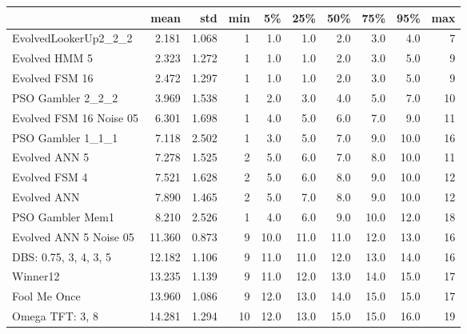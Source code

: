 \begin{tabular}{lrrrrrrrrr}
\toprule
{} &    mean &    std &  min &    5\% &   25\% &   50\% &   75\% &   95\% &  max \\
\midrule
EvolvedLookerUp2\_2\_2    &   2.181 &  1.068 &    1 &   1.0 &   1.0 &   2.0 &   3.0 &   4.0 &    7 \\
Evolved HMM 5           &   2.323 &  1.272 &    1 &   1.0 &   1.0 &   2.0 &   3.0 &   5.0 &    9 \\
Evolved FSM 16          &   2.472 &  1.297 &    1 &   1.0 &   1.0 &   2.0 &   3.0 &   5.0 &    9 \\
PSO Gambler 2\_2\_2       &   3.969 &  1.538 &    1 &   2.0 &   3.0 &   4.0 &   5.0 &   7.0 &   10 \\
Evolved FSM 16 Noise 05 &   6.301 &  1.698 &    1 &   4.0 &   5.0 &   6.0 &   7.0 &   9.0 &   11 \\
PSO Gambler 1\_1\_1       &   7.118 &  2.502 &    1 &   3.0 &   5.0 &   7.0 &   9.0 &  10.0 &   16 \\
Evolved ANN 5           &   7.278 &  1.525 &    2 &   5.0 &   6.0 &   7.0 &   8.0 &  10.0 &   11 \\
Evolved FSM 4           &   7.521 &  1.628 &    2 &   5.0 &   6.0 &   8.0 &   9.0 &  10.0 &   12 \\
Evolved ANN             &   7.890 &  1.465 &    2 &   5.0 &   7.0 &   8.0 &   9.0 &  10.0 &   12 \\
PSO Gambler Mem1        &   8.210 &  2.526 &    1 &   4.0 &   6.0 &   9.0 &  10.0 &  12.0 &   18 \\
Evolved ANN 5 Noise 05  &  11.360 &  0.873 &    9 &  10.0 &  11.0 &  11.0 &  12.0 &  13.0 &   16 \\
DBS: 0.75, 3, 4, 3, 5   &  12.182 &  1.106 &    9 &  11.0 &  11.0 &  12.0 &  13.0 &  14.0 &   16 \\
Winner12                &  13.235 &  1.139 &    9 &  11.0 &  12.0 &  13.0 &  14.0 &  15.0 &   17 \\
Fool Me Once            &  13.960 &  1.086 &    9 &  12.0 &  13.0 &  14.0 &  15.0 &  15.0 &   17 \\
Omega TFT: 3, 8         &  14.281 &  1.294 &   10 &  12.0 &  13.0 &  15.0 &  15.0 &  16.0 &   19 \\
\bottomrule
\end{tabular}

